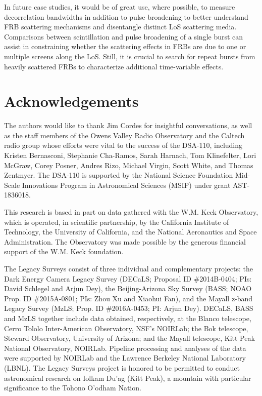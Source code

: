 \documentclass[twocolumn, linenumbers, tra]{aastex631}
\begin{document}
In future case studies, it would be of great use, where possible, to measure decorrelation bandwidths in addition to pulse broadening to better understand FRB scattering mechanisms and disentangle distinct LoS scattering media. Comparisons between scintillation and pulse broadening of a single burst can assist in constraining whether the scattering effects in FRBs are due to one or multiple screens along the LoS. Still, it is crucial to search for repeat bursts from heavily scattered FRBs to characterize additional time-variable effects.


\section{Acknowledgements}

The authors would like to thank Jim Cordes for insightful conversations, as well as the staff members of the Owens Valley Radio Observatory and the Caltech radio group whose efforts were vital to the success of the DSA-110, including Kristen Bernasconi, Stephanie Cha-Ramos, Sarah Harnach, Tom Klinefelter, Lori McGraw, Corey Posner, Andres Rizo, Michael Virgin, Scott White, and Thomas Zentmyer. The DSA-110 is supported by the National Science Foundation Mid-Scale Innovations Program in Astronomical Sciences (MSIP) under grant AST-1836018. 

This research is based in part on data gathered with the W.M. Keck Observatory, which is operated, in scientific partnership, by the California Institute of Technology, the University of California, and the National Aeronautics and Space Administration. The Observatory was made possible by the generous financial support of the W.M. Keck foundation.

The Legacy Surveys consist of three individual and complementary projects: the Dark Energy Camera Legacy Survey (DECaLS; Proposal ID \#2014B-0404; PIs: David Schlegel and Arjun Dey), the Beijing-Arizona Sky Survey (BASS; NOAO Prop. ID \#2015A-0801; PIs: Zhou Xu and Xiaohui Fan), and the Mayall z-band Legacy Survey (MzLS; Prop. ID \#2016A-0453; PI: Arjun Dey). DECaLS, BASS and MzLS together include data obtained, respectively, at the Blanco telescope, Cerro Tololo Inter-American Observatory, NSF’s NOIRLab; the Bok telescope, Steward Observatory, University of Arizona; and the Mayall telescope, Kitt Peak National Observatory, NOIRLab. Pipeline processing and analyses of the data were supported by NOIRLab and the Lawrence Berkeley National Laboratory (LBNL). The Legacy Surveys project is honored to be permitted to conduct astronomical research on Iolkam Du’ag (Kitt Peak), a mountain with particular significance to the Tohono O’odham Nation.
\end{document}
